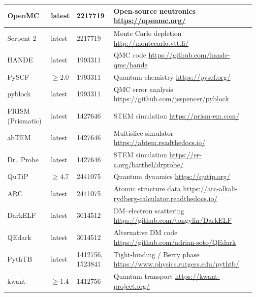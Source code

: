 \documentclass[11pt,a4paper]{article}
\begin{document}
\begin{longtable}{p{4cm} p{2cm} p{3cm} p{4.5cm}}
\midrule
OpenMC & latest & 2217719 & Open-source neutronics \newline \url{https://openmc.org/} \\
\midrule
Serpent 2 & latest & 2217719 & Monte Carlo depletion \newline \url{http://montecarlo.vtt.fi/} \\
\midrule
HANDE & latest & 1993311 & QMC code \newline \url{https://github.com/hande-qmc/hande} \\
\midrule
PySCF & $\geq 2.0$ & 1993311 & Quantum chemistry \newline \url{https://pyscf.org/} \\
\midrule
pyblock & latest & 1993311 & QMC error analysis \newline \url{https://github.com/jsspencer/pyblock} \\
\midrule
PRISM (Prismatic) & latest & 1427646 & STEM simulation \newline \url{https://prism-em.com/} \\
\midrule
abTEM & latest & 1427646 & Multislice simulator \newline \url{https://abtem.readthedocs.io/} \\
\midrule
Dr.\ Probe & latest & 1427646 & STEM simulation \newline \url{https://er-c.org/barthel/drprobe/} \\
\midrule
QuTiP & $\geq 4.7$ & 2441075 & Quantum dynamics \newline \url{https://qutip.org/} \\
\midrule
ARC & latest & 2441075 & Atomic structure data \newline \url{https://arc-alkali-rydberg-calculator.readthedocs.io/} \\
\midrule
DarkELF & latest & 3014512 & DM--electron scattering \newline \url{https://github.com/tongylin/DarkELF} \\
\midrule
QEdark & latest & 3014512 & Alternative DM code \newline \url{https://github.com/adrian-soto/QEdark} \\
\midrule
PythTB & latest & 1412756, 1523841 & Tight-binding / Berry phase \newline \url{https://www.physics.rutgers.edu/pythtb/} \\
\midrule
kwant & $\geq 1.4$ & 1412756 & Quantum transport \newline \url{https://kwant-project.org/} \\

\end{longtable}
\end{document}
